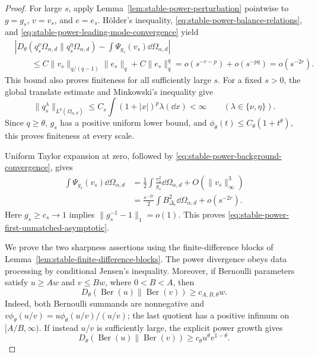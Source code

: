 \begin{proof}
For large \(s\), apply
Lemma~\ref{lem:stable-power-perturbation} pointwise to
\(g=g_s\), \(v=v_s\), and \(e=e_s\).  H\"older's inequality,
\eqref{eq:stable-power-balance-relations}, and
\eqref{eq:stable-power-leading-mode-convergence} yield
\begin{align*}
 &\left|D_\theta(q_s^\nu\Omega_{\alpha,d}\|
                   q_s^\eta\Omega_{\alpha,d})
 -\int\Psi_{g_s}(v_s)\dd\Omega_{\alpha,d}\right|\\
 &\qquad\le C\|v_s\|_{q/(q-1)}\|e_s\|_q
       +C\|e_s\|_q^q
 =o(s^{-r-p})+o(s^{-pq})=o(s^{-2r}).
\end{align*}
This bound also proves finiteness for all sufficiently large \(s\).  For a
fixed \(s>0\), the global translate estimate and Minkowski's inequality give
\[
 \|q_s^\lambda\|_{L^q(\Omega_{\alpha,d})}
 \le C_s\int(1+|x|)^p\lambda(\dd x)<\infty
 \qquad(\lambda\in\{\nu,\eta\}).
\]
Since \(q\ge\theta\), \(g_s\) has a positive uniform lower bound, and
\(\phi_\theta(t)\le C_\theta(1+t^\theta)\), this proves finiteness at every
scale.

Uniform Taylor expansion at zero, followed by
\eqref{eq:stable-power-background-convergence}, gives
\begin{align*}
 \int\Psi_{g_s}(v_s)\dd\Omega_{\alpha,d}
 &=\frac12\int\frac{v_s^2}{g_s}\dd\Omega_{\alpha,d}
   +O(\|v_s\|_\infty^3)\\
 &=\frac{s^{-2r}}2\int B_{\Delta_r}^2
       \dd\Omega_{\alpha,d}+o(s^{-2r}).
\end{align*}
Here \(g_s\ge c_s\to1\) implies
\(\|g_s^{-1}-1\|_1=o(1)\).  This proves
\eqref{eq:stable-power-first-unmatched-asymptotic}.

We prove the two sharpness assertions using the finite-difference blocks
of Lemma~\ref{lem:stable-finite-difference-blocks}.  The power divergence
obeys data processing by conditional Jensen's inequality.  Moreover, if
Bernoulli parameters satisfy \(u\ge Aw\) and \(v\le Bw\), where
\(0<B<A\), then
\begin{equation}\label{eq:stable-power-bernoulli-linear-bound}
 D_\theta(\operatorname{Ber}(u)\|
          \operatorname{Ber}(v))\ge c_{A,B,\theta}w.
\end{equation}
Indeed, both Bernoulli summands are nonnegative and
\(v\phi_\theta(u/v)=u\phi_\theta(u/v)/(u/v)\); the last quotient has a
positive infimum on \([A/B,\infty)\).  If instead \(u/v\) is sufficiently
large, the explicit power growth gives
\begin{equation}\label{eq:stable-power-bernoulli-power-bound}
 D_\theta(\operatorname{Ber}(u)\|
          \operatorname{Ber}(v))\ge c_\theta u^\theta v^{1-\theta}.
\end{equation}


\end{proof}
